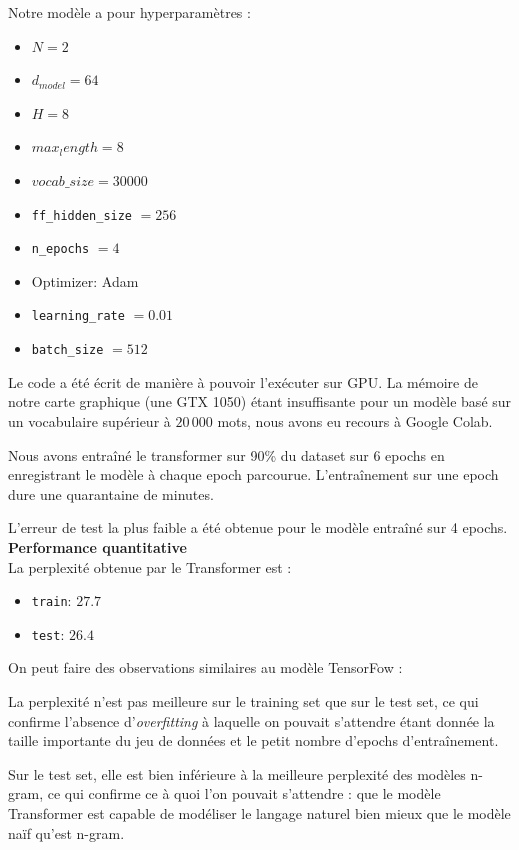 Notre modèle a pour hyperparamètres :
\begin{itemize}
\item
  \(N = 2\)
\item
  \(d_{model} = 64\)
\item
  \(H = 8\)
\item
  \(max_length = 8\)
\item
  \(vocab\_size = 30 000\)
\item
  \texttt{ff\_hidden\_size} $ = 256$
\item
  \texttt{n\_epochs} $ = 4$
\item
  Optimizer: Adam
\item
  \texttt{learning\_rate} $ = 0.01 $
\item
  \texttt{batch\_size} $ = 512 $
\end{itemize}

Le code a été écrit de manière à pouvoir l’exécuter sur GPU. La mémoire de notre carte graphique
(une GTX 1050) étant insuffisante pour un modèle basé sur un vocabulaire supérieur à
$20\,000$ mots, nous avons eu recours à Google Colab.

Nous avons entraîné le transformer sur 90\% du dataset sur 6 epochs en enregistrant
le modèle à chaque epoch parcourue. L'entraînement sur une epoch dure une quarantaine de minutes.

L’erreur de test la plus faible a été obtenue pour le modèle entraîné sur 4 epochs. \\

\noindent{}\textbf{Performance quantitative} \\

La perplexité obtenue par le Transformer est :

\begin{itemize}
\item
  \texttt{train}: \(27.7\)
\item
  \texttt{test}: \(26.4\)
\end{itemize}

On peut faire des observations similaires au modèle TensorFow :

La perplexité n'est pas meilleure sur le training set que sur
le test set, ce qui confirme l'absence d'\textit{overfitting} à laquelle
on pouvait s'attendre étant donnée la taille importante du jeu de
données et le petit nombre d'epochs d'entraînement.

Sur le test set, elle est bien inférieure à la
meilleure perplexité des modèles n-gram, ce qui confirme ce
à quoi l'on pouvait s'attendre : que le modèle Transformer est capable
de modéliser le langage naturel bien mieux que le modèle naïf qu'est
n-gram. \\


